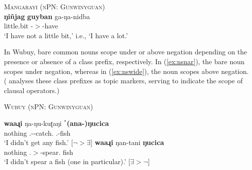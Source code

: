 \documentclass[12pt,egregdoesnotlikesansseriftitles]{scrartcl}
\begin{document}
\begin{exe}
  \ex \textsc{Mangarayi (nPN: Gunwinyguan)} \hfill {} \label{mangarayiquantneg1}\\
  \gll \textbf{ŋi\~{n}jag} \textbf{guyban} ga-ŋa-nidba\\
  \Proh{} little.bit \Third-\Fsg$>$\Tsg-have\\
  \glt `I have not a little bit,' i.e., `I have a lot.' %
\end{exe}

In Wubuy, bare common nouns scope under or above negation depending on the presence or absence of a class prefix, respectively. In (\ref{ex:nsnar}), the bare noun scopes under negation, whereas in (\ref{ex:nswide}), the noun scopes above negation. (\citet{baker08} analyses these class prefixes as topic markers, serving to indicate the scope of clausal operators.)

\begin{exe}
  \ex\label{ex:nuyscope} \textsc{Wubuy (nPN: Gunwinyguan)}\hfill {}
  \begin{xlist}
    \ex\label{ex:nsnar}\gll \textbf{waaɻi} ŋa-ŋu-kuʈaŋi $^*$\textbf{(ana-)ŋucica}\\
    nothing \Fsg.\Sarg-\Clneut-catch.\Pcon{} \phantom{$^*$(}\Clneut.\Top-fish\\
    \glt `I didn't get any fish.' \hfill [$\neg > \exists$]
    \ex\label{ex:nswide}\gll \textbf{waaɻi} ŋan-tani \textbf{ŋucica}\\
    nothing \Fsg.\Sarg$>$\Anim-spear.\Pcon{} fish\\
    \glt `I didn't spear a fish (one in particular).' \hfill [$\exists > \neg$]
  \end{xlist}
\end{exe}
\end{document}
